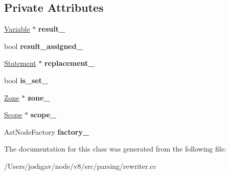 \subsection*{Private Attributes}
\begin{DoxyCompactItemize}
\item 
\hyperlink{classv8_1_1internal_1_1_variable}{Variable} $\ast$ {\bfseries result\+\_\+}\hypertarget{classv8_1_1internal_1_1_processor_adbbb310bfcb8d724f77d74005df5c98d}{}\label{classv8_1_1internal_1_1_processor_adbbb310bfcb8d724f77d74005df5c98d}

\item 
bool {\bfseries result\+\_\+assigned\+\_\+}\hypertarget{classv8_1_1internal_1_1_processor_ac6fff3614bb41ba773049b61affa21e9}{}\label{classv8_1_1internal_1_1_processor_ac6fff3614bb41ba773049b61affa21e9}

\item 
\hyperlink{classv8_1_1internal_1_1_statement}{Statement} $\ast$ {\bfseries replacement\+\_\+}\hypertarget{classv8_1_1internal_1_1_processor_a8765eabdd635cce6abb97eccd01baa9e}{}\label{classv8_1_1internal_1_1_processor_a8765eabdd635cce6abb97eccd01baa9e}

\item 
bool {\bfseries is\+\_\+set\+\_\+}\hypertarget{classv8_1_1internal_1_1_processor_a78ef8ef0e6f6ccb9635e6ed7b4eb978b}{}\label{classv8_1_1internal_1_1_processor_a78ef8ef0e6f6ccb9635e6ed7b4eb978b}

\item 
\hyperlink{classv8_1_1internal_1_1_zone}{Zone} $\ast$ {\bfseries zone\+\_\+}\hypertarget{classv8_1_1internal_1_1_processor_a46912f704b3fcfb83f89526bfe1a77a1}{}\label{classv8_1_1internal_1_1_processor_a46912f704b3fcfb83f89526bfe1a77a1}

\item 
\hyperlink{classv8_1_1internal_1_1_scope}{Scope} $\ast$ {\bfseries scope\+\_\+}\hypertarget{classv8_1_1internal_1_1_processor_a2523337264ecd832a8eb9447d4637af2}{}\label{classv8_1_1internal_1_1_processor_a2523337264ecd832a8eb9447d4637af2}

\item 
Ast\+Node\+Factory {\bfseries factory\+\_\+}\hypertarget{classv8_1_1internal_1_1_processor_ae8afc991eb69af00e805e5548371d6af}{}\label{classv8_1_1internal_1_1_processor_ae8afc991eb69af00e805e5548371d6af}

\end{DoxyCompactItemize}


The documentation for this class was generated from the following file\+:\begin{DoxyCompactItemize}
\item 
/\+Users/joshgav/node/v8/src/parsing/rewriter.\+cc\end{DoxyCompactItemize}
